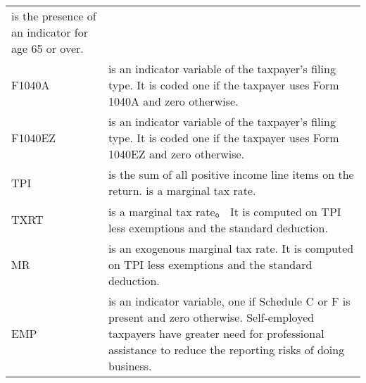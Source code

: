 \documentclass[]{book}
\begin{document}
\begin{longtable}[]{@{}ll@{}}
\begin{minipage}[t]{0.88\columnwidth}
is the presence of an indicator for age 65 or over.\strut
\end{minipage}\tabularnewline
\begin{minipage}[t]{0.06\columnwidth}\raggedright
F1040A\strut
\end{minipage} & \begin{minipage}[t]{0.88\columnwidth}\raggedright
is an indicator variable of the taxpayer's filing type. It is coded one if the taxpayer uses Form 1040A and zero otherwise.\strut
\end{minipage}\tabularnewline
\begin{minipage}[t]{0.06\columnwidth}\raggedright
F1040EZ\strut
\end{minipage} & \begin{minipage}[t]{0.88\columnwidth}\raggedright
is an indicator variable of the taxpayer's filing type. It is coded one if the taxpayer uses Form 1040EZ and zero otherwise.\strut
\end{minipage}\tabularnewline
\begin{minipage}[t]{0.06\columnwidth}\raggedright
TPI\strut
\end{minipage} & \begin{minipage}[t]{0.88\columnwidth}\raggedright
is the sum of all positive income line items on the return. is a marginal tax rate.\strut
\end{minipage}\tabularnewline
\begin{minipage}[t]{0.06\columnwidth}\raggedright
TXRT\strut
\end{minipage} & \begin{minipage}[t]{0.88\columnwidth}\raggedright
is a marginal tax rate。 It is computed on TPI less exemptions and the standard deduction.\strut
\end{minipage}\tabularnewline
\begin{minipage}[t]{0.06\columnwidth}\raggedright
MR\strut
\end{minipage} & \begin{minipage}[t]{0.88\columnwidth}\raggedright
is an exogenous marginal tax rate. It is computed on TPI less exemptions and the standard deduction.\strut
\end{minipage}\tabularnewline
\begin{minipage}[t]{0.06\columnwidth}\raggedright
EMP\strut
\end{minipage} & \begin{minipage}[t]{0.88\columnwidth}\raggedright
is an indicator variable, one if Schedule C or F is present and zero otherwise. Self-employed taxpayers have greater need for professional assistance to reduce the reporting risks of doing business.\strut

\end{minipage}
\end{longtable}
\end{document}
